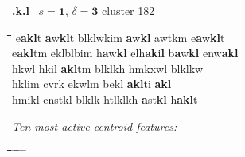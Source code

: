 \begin{figure}[!t]
\begin{mdframed}
\vspace{2pt}
{\LARGE \textbf{.k.l}} \,\Large{} \hfill \large{$s = \mathbf{1}$, $\delta = \mathbf{3}$} \hfill {\normalsize cluster 182}%
\vspace{3pt}
\begin{normalsize}
\begin{tabbing}
\hspace*{15ex}\= \hspace*{16ex}\=\hspace*{16ex}\=\hspace*{16ex}\=\hspace*{16ex}\=\hspace*{13ex} \kill
e\textbf{a}\textbf{k}\textbf{l}t \> \textbf{a}w\textbf{k}\textbf{l}t \> blklwkim \> \textbf{a}w\textbf{k}\textbf{l} \> awtkm \> e\textbf{a}w\textbf{k}\textbf{l}t \\
e\textbf{a}\textbf{k}\textbf{l}tm \> eklblbim \> h\textbf{a}w\textbf{k}\textbf{l} \> elh\textbf{a}\textbf{k}i\textbf{l} \> b\textbf{a}w\textbf{k}\textbf{l} \> enw\textbf{a}\textbf{k}\textbf{l} \\
hkwl \> hkil \> \textbf{a}\textbf{k}\textbf{l}tm \> blklkh \> hmkxwl \> blklkw \\
hklim \> cvrk \> ekwlm \> bekl \> \textbf{a}\textbf{k}\textbf{l}ti \> \textbf{a}\textbf{k}\textbf{l} \\
hmikl \> enstkl \> blklk \> htlklkh \> \textbf{a}st\textbf{k}\textbf{l} \> h\textbf{a}\textbf{k}\textbf{l}t 
\end{tabbing}
\end{normalsize}
\vspace{3pt}
\begin{mdframed}
\begin{small}
\textit{Ten most active centroid features:}
\vspace{-5pt}
\begin{tabbing}
\hspace*{6ex}\= \hspace*{12ex}\= \hspace*{6ex}\= \hspace*{12ex}\= \hspace*{6ex} \= \hspace*{12ex} \= \hspace*{6ex}\= \hspace*{12ex} \= \hspace*{6ex} \= \hspace*{10ex}\kill

\end{tabbing}
\end{small}
\end{mdframed}
\end{mdframed}
\end{figure}
